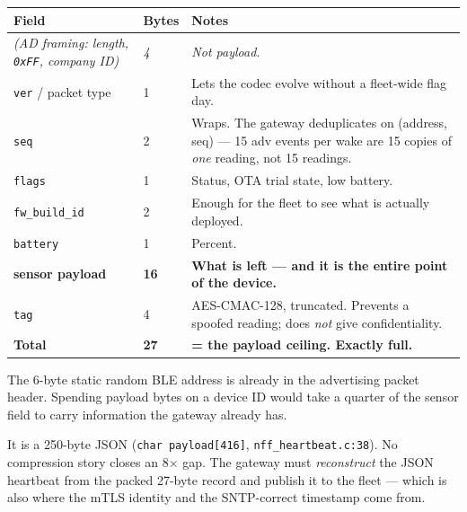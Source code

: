 \documentclass[11pt,a4paper]{article}
\begin{document}
\begin{center}
\begin{tabularx}{\textwidth}{llX}
\toprule
\textbf{Field} & \textbf{Bytes} & \textbf{Notes} \\
\midrule
\textit{(AD framing: length, \texttt{0xFF}, company ID)} & \textit{4} & \textit{Not payload.} \\
\midrule
\texttt{ver} / packet type & 1  & Lets the codec evolve without a fleet-wide flag day. \\
\texttt{seq}               & 2  & Wraps. The gateway deduplicates on (address, seq) --- \num{15} adv events per wake are \num{15} copies of \emph{one} reading, not \num{15} readings. \\
\texttt{flags}             & 1  & Status, OTA trial state, low battery. \\
\texttt{fw\_build\_id}     & 2  & Enough for the fleet to see what is actually deployed. \\
\texttt{battery}           & 1  & Percent. \\
\textbf{sensor payload}    & \textbf{16} & \textbf{What is left --- and it is the entire point of the device.} \\
\texttt{tag}               & 4  & AES-CMAC-128, truncated. Prevents a spoofed reading; does \emph{not} give confidentiality. \\
\midrule
\textbf{Total} & \textbf{27} & \textbf{= the payload ceiling. Exactly full.} \\
\bottomrule
\end{tabularx}
\end{center}

\begin{description}[style=nextline,leftmargin=0pt]
  \item[The device identity is free --- do not pay for it twice.] The 6-byte static random BLE
        address is already in the advertising packet header. Spending payload bytes on a device ID
        would take a quarter of the sensor field to carry information the gateway already has.
  \item[The nff heartbeat does not fit, by \num{8}$\times$.] It is a 250-byte JSON
        (\texttt{char payload[416]}, \texttt{nff\_heartbeat.c:38}). No compression story closes an
        \num{8}$\times$ gap. The gateway must \emph{reconstruct} the JSON heartbeat from the
        packed 27-byte record and publish it to the fleet --- which is also where the mTLS
        identity and the SNTP-correct timestamp come from.
\end{description}
\end{document}
